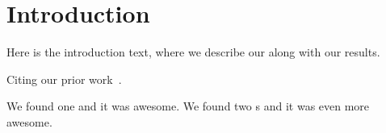\section{Introduction}
\label{sec:intro}

Here is the introduction text, where we describe our \Toolname{} along
with our \TotalResults{} results.


Citing our prior work~\cite{ShiETAL2014FSE, ShiETAL2019FSE, GyoriETAL2015ISSTA}.

We found one \bug{} and it was awesome.
We found two \bug{}s and it was even more awesome.
